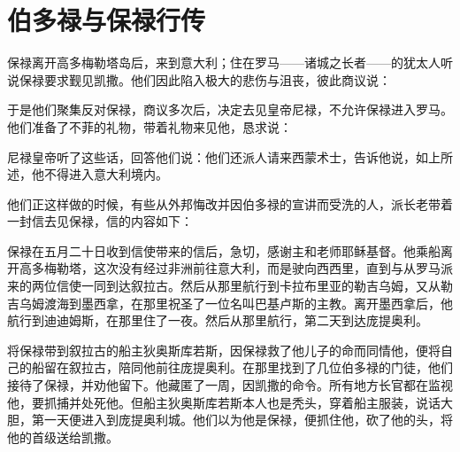 
\chapter{伯多禄与保禄行传}


保禄离开高多梅勒塔岛后，来到意大利；住在罗马——诸城之长者——的犹太人听说保禄要求觐见凯撒。他们因此陷入极大的悲伤与沮丧，彼此商议说：\par

于是他们聚集反对保禄，商议多次后，决定去见皇帝尼禄，不允许保禄进入罗马。他们准备了不菲的礼物，带着礼物来见他，恳求说：\par

尼禄皇帝听了这些话，回答他们说：他们还派人请来西蒙术士，告诉他说，如上所述，他不得进入意大利境内。\par

他们正这样做的时候，有些从外邦悔改并因伯多禄的宣讲而受洗的人，派长老带着一封信去见保禄，信的内容如下：\par

保禄在五月二十日收到信使带来的信后，急切，感谢主和老师耶稣基督。他乘船离开高多梅勒塔，这次没有经过非洲前往意大利，而是驶向西西里，直到与从罗马派来的两位信使一同到达叙拉古。然后从那里航行到卡拉布里亚的勒吉乌姆，又从勒吉乌姆渡海到墨西拿，在那里祝圣了一位名叫巴基卢斯的主教。离开墨西拿后，他航行到迪迪姆斯，在那里住了一夜。然后从那里航行，第二天到达庞提奥利。\par

将保禄带到叙拉古的船主狄奥斯库若斯，因保禄救了他儿子的命而同情他，便将自己的船留在叙拉古，陪同他前往庞提奥利。在那里找到了几位伯多禄的门徒，他们接待了保禄，并劝他留下。他藏匿了一周，因凯撒的命令。所有地方长官都在监视他，要抓捕并处死他。但船主狄奥斯库若斯本人也是秃头，穿着船主服装，说话大胆，第一天便进入到庞提奥利城。他们以为他是保禄，便抓住他，砍了他的头，将他的首级送给凯撒。\par

